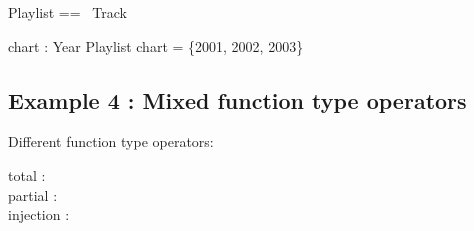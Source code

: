 \documentclass[a4paper,10pt,fleqn]{article}
\begin{document}
\begin{zed}
[Track]
\end{zed}

\begin{zed}
Playlist == \seq~Track
\end{zed}

\begin{axdef}
chart : Year \pinj Playlist
\where
\dom chart = \{2001, 2002, 2003\}
\end{axdef}

\subsection*{Example 4 : Mixed function type operators}

\noindent Different function type operators:

\bigskip

\begin{axdef}
total : \nat \fun \nat \\
partial : \nat \pfun \nat \\
injection : \nat \pinj \nat
\end{axdef}
\end{document}
